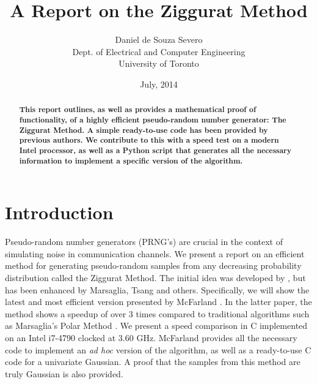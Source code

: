 \documentclass[11pt,onecolumn]{article}
\begin{document}
\title{A Report on the Ziggurat Method}
\author{Daniel de Souza Severo\\
Dept. of Electrical and Computer Engineering\\
University of Toronto}
\date{July, 2014}
\maketitle
\begin{abstract}

\textbf{This report outlines, as well as provides a mathematical proof of functionality, of a highly efficient pseudo-random number generator: The Ziggurat Method. A simple ready-to-use code has been provided by previous authors. We contribute to this with a speed test on a modern Intel processor, as well as a Python script that generates all the necessary information to implement a specific version of the algorithm.}
\end{abstract}

\section{Introduction}
Pseudo-random number generators (PRNG's) are crucial in the context of simulating noise in communication channels. We present a report on an efficient method for generating pseudo-random samples from any decreasing probability distribution called the Ziggurat Method. The initial idea was developed by \cite{marsaglia1964convenient}, but has been enhanced by Marsaglia, Tsang \cite{marsaglia2000ziggurat} and others. Specifically, we will show the latest and most efficient version presented by McFarland \cite{mcfarland2016modified}. In the latter paper, the method shows a speedup of over 3 times compared to traditional algorithms such as Marsaglia's Polar Method \cite{marsaglia1984fast}. We present a speed comparison in C implemented on an Intel i7-4790 clocked at 3.60 GHz. McFarland \cite{mcfarland2016modified} provides all the necessary code to implement an \textit{ad hoc} version of the algorithm, as well as a ready-to-use C code for a univariate Gaussian. A proof that the samples from this method are truly Gaussian is also provided.
\end{document}
